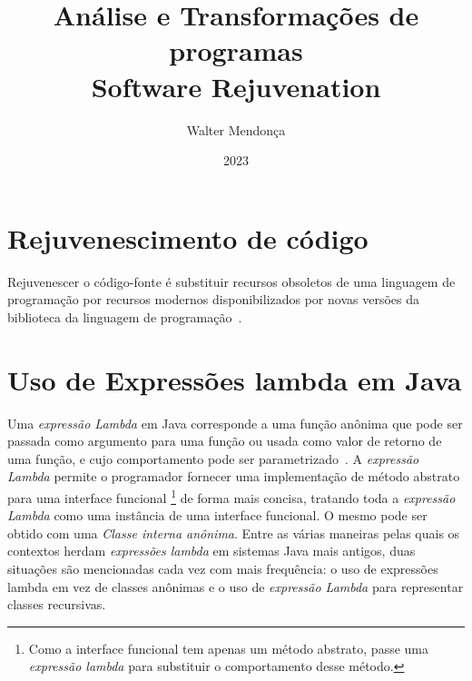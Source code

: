 \documentclass{article}
\title{Análise e Transformações de programas \\
\vspace{7.5pt} 
\textbf{Software Rejuvenation}}
\author{Walter Mendonça}
\date{2023}
\begin{document}
\maketitle

\section{Rejuvenescimento de código}

Rejuvenescer o código-fonte é substituir recursos obsoletos de uma linguagem de programação por recursos modernos disponibilizados por novas versões da biblioteca da linguagem de programação~\cite{pirkelbauer2010source}.

\section{Uso de Expressões lambda em Java}%
\label{lambda-java}

Uma \emph{expressão Lambda} em Java corresponde a uma função anônima que pode ser passada como argumento para uma função ou usada como valor de retorno de uma função, e cujo comportamento pode ser parametrizado~\cite{urma2014java}. A \emph{expressão Lambda} permite o programador fornecer uma implementação de método abstrato para uma interface funcional \footnote{Como a interface funcional tem apenas um método abstrato, passe uma \emph{expressão lambda} para substituir o comportamento desse método.} de forma mais concisa, tratando toda a \emph{expressão Lambda} como uma instância de uma interface funcional. O mesmo pode ser obtido com uma \emph{Classe interna anônima}. Entre as várias maneiras pelas quais os contextos herdam \emph{expressões lambda} em sistemas Java mais antigos, duas situações são mencionadas cada vez com mais frequência: o uso de expressões lambda em vez de classes anônimas e o uso de \emph{expressão Lambda} para representar classes recursivas.

\end{document}
